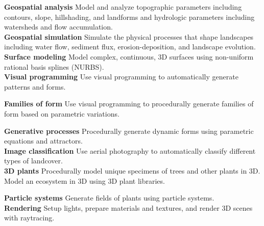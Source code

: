 \documentclass[11pt,article,oneside]{memoir}
\begin{document}

\noindent \textbf{Geospatial analysis}
Model and analyze topographic parameters including 
contours, slope, hillshading, and landforms
and hydrologic parameters 
including watersheds and flow accumulation. \\

\noindent \textbf{Geospatial simulation}
Simulate the physical processes that shape landscapes including
water flow, sediment flux, erosion-deposition, and landscape evolution.\\

\noindent \textbf{Surface modeling}
Model complex, continuous, 3D surfaces 
using non-uniform rational basis splines (NURBS).\\

\noindent \textbf{Visual programming}
Use visual programming to automatically generate
patterns and forms.
%
\nocite{*} \printbibliography[keyword=algorithmic, heading=none]
\vspace*{0.5em}

\noindent \textbf{Families of form}
Use visual programming to procedurally generate families of form
based on parametric variations.
%
\nocite{*} \printbibliography[keyword=procedural, heading=none]
\vspace*{0.5em}

\noindent \textbf{Generative processes}
Procedurally generate dynamic forms using 
parametric equations and attractors.\\

\noindent \textbf{Image classification}
Use aerial photography to automatically classify 
different types of landcover.\\

\noindent \textbf{3D plants}
Procedurally model unique specimens 
of trees and other plants in 3D.
Model an ecosystem in 3D using 3D plant libraries.
%
\nocite{*} \printbibliography[keyword=plants, heading=none]
\vspace*{0.5em}

\noindent \textbf{Particle systems}
Generate fields of plants 
using particle systems. \\

\noindent \textbf{Rendering}
Setup lights, prepare materials and textures, 
and render 3D scenes with raytracing.\\
\end{document}
